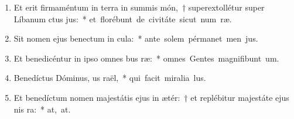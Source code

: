 \begin{flushleft}
\begin{enumerate}[leftmargin=*]
\item Et erit firmaméntum in terra in summis món,~† superextollétur super Líbanum ctus jus:~* \mbox{et florébunt de civitáte sicut num ræ.}
\item Sit nomen ejus benectum in cula:~* \mbox{ante solem pérmanet men jus.}
\item Et benedicéntur in ipso omnes bus ræ:~* \mbox{omnes Gentes magnifibunt um.}
\item Benedíctus Dóminus, us raël,~* \mbox{qui facit miralia lus.}
\item Et benedíctum nomen majestátis ejus in ætér:~† et replébitur majestáte ejus nis ra:~* \mbox{at, at.}

\end{enumerate}
\end{flushleft}

